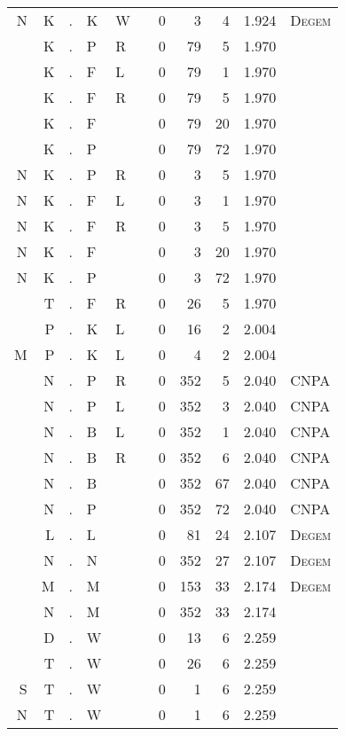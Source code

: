 \begin{longtable}{r@{ } r@{ } c@{ } l@{ } l@{ } l@{ } r r r r l }
N & K & . & K & W &   & 0 & 3 & 4 & 1.924 & \textsc{Degem} \\
  & K & . & P & R &   & 0 & 79 & 5 & 1.970 &  \\
  & K & . & F & L &   & 0 & 79 & 1 & 1.970 &  \\
  & K & . & F & R &   & 0 & 79 & 5 & 1.970 &  \\
  & K & . & F &   &   & 0 & 79 & 20 & 1.970 &  \\
  & K & . & P &   &   & 0 & 79 & 72 & 1.970 &  \\
N & K & . & P & R &   & 0 & 3 & 5 & 1.970 &  \\
N & K & . & F & L &   & 0 & 3 & 1 & 1.970 &  \\
N & K & . & F & R &   & 0 & 3 & 5 & 1.970 &  \\
N & K & . & F &   &   & 0 & 3 & 20 & 1.970 &  \\
N & K & . & P &   &   & 0 & 3 & 72 & 1.970 &  \\
  & T & . & F & R &   & 0 & 26 & 5 & 1.970 &  \\
  & P & . & K & L &   & 0 & 16 & 2 & 2.004 &  \\
M & P & . & K & L &   & 0 & 4 & 2 & 2.004 &  \\
  & N & . & P & R &   & 0 & 352 & 5 & 2.040 & \textsc{CNPA} \\
  & N & . & P & L &   & 0 & 352 & 3 & 2.040 & \textsc{CNPA} \\
  & N & . & B & L &   & 0 & 352 & 1 & 2.040 & \textsc{CNPA} \\
  & N & . & B & R &   & 0 & 352 & 6 & 2.040 & \textsc{CNPA} \\
  & N & . & B &   &   & 0 & 352 & 67 & 2.040 & \textsc{CNPA} \\
  & N & . & P &   &   & 0 & 352 & 72 & 2.040 & \textsc{CNPA} \\
  & L & . & L &   &   & 0 & 81 & 24 & 2.107 & \textsc{Degem} \\
  & N & . & N &   &   & 0 & 352 & 27 & 2.107 & \textsc{Degem} \\
  & M & . & M &   &   & 0 & 153 & 33 & 2.174 & \textsc{Degem} \\
  & N & . & M &   &   & 0 & 352 & 33 & 2.174 &  \\
  & D & . & W &   &   & 0 & 13 & 6 & 2.259 &  \\
  & T & . & W &   &   & 0 & 26 & 6 & 2.259 &  \\
S & T & . & W &   &   & 0 & 1 & 6 & 2.259 &  \\
N & T & . & W &   &   & 0 & 1 & 6 & 2.259 &  \\

\end{longtable}
